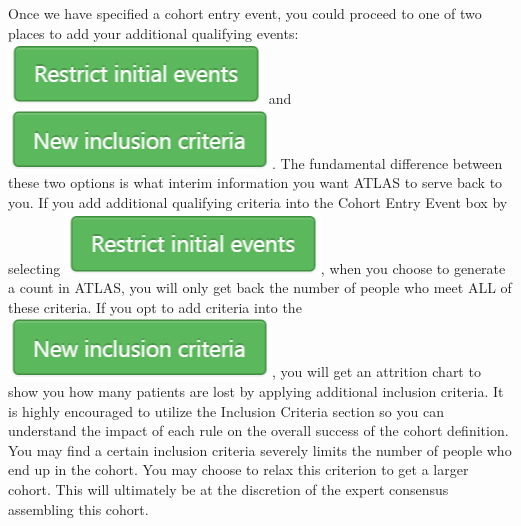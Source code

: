 \documentclass[11pt]{book}
\theoremstyle{definition}
\theoremstyle{definition}
\theoremstyle{definition}
\theoremstyle{remark}
\begin{document}
Once we have specified a cohort entry event, you could proceed to one of two places to add your additional qualifying events: \includegraphics{images/Cohorts/restrict.png} and \includegraphics{images/Cohorts/newinclusion.png}. The fundamental difference between these two options is what interim information you want ATLAS to serve back to you. If you add additional qualifying criteria into the Cohort Entry Event box by selecting \includegraphics{images/Cohorts/restrict.png}, when you choose to generate a count in ATLAS, you will only get back the number of people who meet ALL of these criteria. If you opt to add criteria into the \includegraphics{images/Cohorts/newinclusion.png}, you will get an attrition chart to show you how many patients are lost by applying additional inclusion criteria. It is highly encouraged to utilize the Inclusion Criteria section so you can understand the impact of each rule on the overall success of the cohort definition. You may find a certain inclusion criteria severely limits the number of people who end up in the cohort. You may choose to relax this criterion to get a larger cohort. This will ultimately be at the discretion of the expert consensus assembling this cohort.
\end{document}
